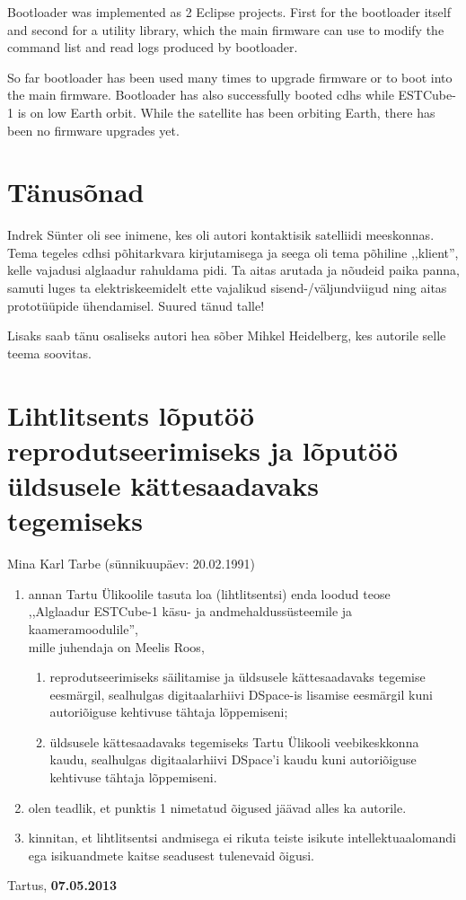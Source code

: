 \documentclass[12pt,a4paper]{article}
\begin{document}
Bootloader was implemented as 2 Eclipse projects. First for the bootloader itself
and second for a utility library, which the main firmware can use to modify the
command list and read logs produced by bootloader.

So far bootloader has been used many times to upgrade firmware or to boot into
the main firmware. Bootloader has also successfully booted \gls{cdhs} while
ESTCube-1 is on low Earth orbit. While the satellite has been orbiting Earth,
there has been no firmware upgrades yet.

\section*{Tänusõnad}
Indrek Sünter oli see inimene, kes oli autori kontaktisik satelliidi meeskonnas.
Tema tegeles \gls{cdhs}i põhitarkvara kirjutamisega ja seega oli tema põhiline
,,klient'', kelle vajadusi alglaadur rahuldama pidi. Ta aitas arutada ja nõudeid
paika panna, samuti luges ta elektriskeemidelt ette vajalikud
sisend-/väljundviigud ning aitas prototüüpide ühendamisel. Suured tänud talle!

Lisaks saab tänu osaliseks autori hea sõber Mihkel Heidelberg, kes autorile selle
teema soovitas.

\label{viited}



\pagebreak
\section*{Lihtlitsents lõputöö reprodutseerimiseks ja lõputöö üldsusele
kättesaadavaks tegemiseks}

Mina Karl Tarbe (sünnikuupäev: 20.02.1991)
\begin{enumerate}
	\item
		annan Tartu Ülikoolile tasuta loa (lihtlitsentsi) enda loodud teose\\
		,,Alglaadur ESTCube-1 käsu- ja andmehaldussüsteemile ja
		kaameramoodulile'',\\
		mille juhendaja on Meelis Roos,
		\begin{enumerate}
			\item 
				reprodutseerimiseks säilitamise ja üldsusele kättesaadavaks
				tegemise eesmärgil, sealhulgas digitaalarhiivi DSpace-is
				lisamise eesmärgil kuni autoriõiguse kehtivuse tähtaja
				lõppemiseni;
			\item
				üldsusele kättesaadavaks tegemiseks Tartu Ülikooli
				veebikeskkonna kaudu, sealhulgas digitaalarhiivi DSpace'i kaudu
				kuni autoriõiguse kehtivuse tähtaja lõppemiseni.
		\end{enumerate}
	\item
		olen teadlik, et punktis 1 nimetatud õigused jäävad alles ka autorile.
	\item
		kinnitan, et lihtlitsentsi andmisega ei rikuta teiste isikute
		intellektuaalomandi ega isikuandmete kaitse seadusest tulenevaid õigusi.
\end{enumerate}

Tartus, \textbf{07.05.2013}
\end{document}
